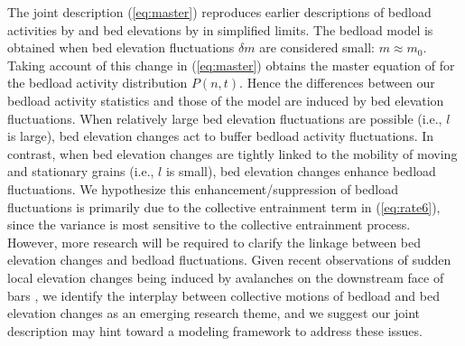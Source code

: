 \documentclass[draft]{agujournal2018}
\begin{document}
The joint description (\ref{eq:master}) reproduces earlier descriptions of bedload activities by \citet{Ancey2008} and bed elevations by \citet{Martin2014} in simplified limits.
The \citet{Ancey2008} bedload model is obtained when bed elevation fluctuations $\delta m$ are considered small: $m \approx m_0$.
Taking account of this change in (\ref{eq:master}) obtains the master equation of \citet{Ancey2008} for the bedload activity distribution $P(n,t)$.
Hence the differences between our bedload activity statistics and those of the \citet{Ancey2008} model are induced by bed elevation fluctuations.
When relatively large bed elevation fluctuations are possible (i.e., $l$ is large), bed elevation changes act to buffer bedload activity fluctuations.
In contrast, when bed elevation changes are tightly linked to the mobility of moving and stationary grains (i.e., $l$ is small), bed elevation changes enhance bedload fluctuations.
We hypothesize this enhancement/suppression of bedload fluctuations is primarily due to the collective entrainment term in (\ref{eq:rate6}), since the \citet{Ancey2008} variance is most sensitive to the collective entrainment process.
However, more research will be required to clarify the linkage between bed elevation changes and bedload fluctuations.
Given recent observations of sudden local elevation changes being induced by avalanches on the downstream face of bars \citep{Dhont2018}, we identify the interplay between collective motions of bedload and bed elevation changes as an emerging research theme, and we suggest our joint description may hint toward a modeling framework to address these issues.
\end{document}
